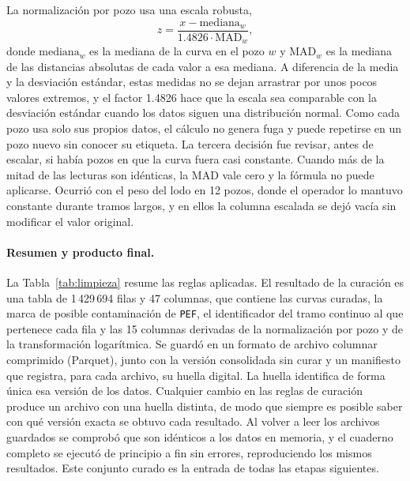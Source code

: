 \documentclass[11pt,a4paper]{article}
\begin{document}
La normalización por pozo usa una escala robusta,
\begin{equation}
z = \frac{x - \mathrm{mediana}_w}{1.4826 \cdot \mathrm{MAD}_w} ,
\end{equation}
donde $\mathrm{mediana}_w$ es la mediana de la curva en el pozo $w$ y $\mathrm{MAD}_w$ es la mediana de las distancias absolutas de cada valor a esa mediana. A diferencia de la media y la desviación estándar, estas medidas no se dejan arrastrar por unos pocos valores extremos, y el factor 1.4826 hace que la escala sea comparable con la desviación estándar cuando los datos siguen una distribución normal. Como cada pozo usa solo sus propios datos, el cálculo no genera fuga y puede repetirse en un pozo nuevo sin conocer su etiqueta. La tercera decisión fue revisar, antes de escalar, si había pozos en que la curva fuera casi constante. Cuando más de la mitad de las lecturas son idénticas, la MAD vale cero y la fórmula no puede aplicarse. Ocurrió con el peso del lodo en 12 pozos, donde el operador lo mantuvo constante durante tramos largos, y en ellos la columna escalada se dejó vacía sin modificar el valor original.

\paragraph{Resumen y producto final.} La Tabla~\ref{tab:limpieza} resume las reglas aplicadas. El resultado de la curación es una tabla de 1\,429\,694 filas y 47 columnas, que contiene las curvas curadas, la marca de posible contaminación de \texttt{PEF}, el identificador del tramo continuo al que pertenece cada fila y las 15 columnas derivadas de la normalización por pozo y de la transformación logarítmica. Se guardó en un formato de archivo columnar comprimido (Parquet), junto con la versión consolidada sin curar y un manifiesto que registra, para cada archivo, su huella digital. La huella identifica de forma única esa versión de los datos. Cualquier cambio en las reglas de curación produce un archivo con una huella distinta, de modo que siempre es posible saber con qué versión exacta se obtuvo cada resultado. Al volver a leer los archivos guardados se comprobó que son idénticos a los datos en memoria, y el cuaderno completo se ejecutó de principio a fin sin errores, reproduciendo los mismos resultados. Este conjunto curado es la entrada de todas las etapas siguientes.
\end{document}
